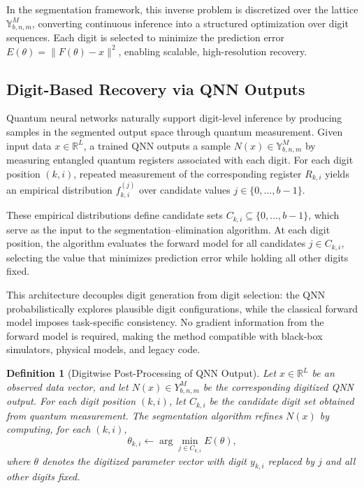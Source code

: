 \documentclass[aps,twocolumn,superscriptaddress,nofootinbib]{revtex4}
\newtheorem{definition}{Definition}
\begin{document}
In the segmentation framework, this inverse problem is discretized over the lattice $\mathbb{Y}_{b,n,m}^M$, converting continuous inference into a structured optimization over digit sequences. Each digit is selected to minimize the prediction error $E(\theta) = \|F(\theta) - x\|^2$, enabling scalable, high-resolution recovery.

\subsection{Digit-Based Recovery via QNN Outputs}
Quantum neural networks naturally support digit-level inference by producing samples in the segmented output space through quantum measurement. Given input data $x \in \mathbb{R}^L$, a trained QNN outputs a sample $N(x) \in \mathbb{Y}_{b,n,m}^M$ by measuring entangled quantum registers associated with each digit. For each digit position $(k, i)$, repeated measurement of the corresponding register $R_{k,i}$ yields an empirical distribution $f^{(j)}_{k,i}$ over candidate values $j \in \{0, \ldots, b - 1\}$.

These empirical distributions define candidate sets $C_{k,i} \subseteq \{0, \ldots, b - 1\}$, which serve as the input to the segmentation--elimination algorithm. At each digit position, the algorithm evaluates the forward model for all candidates $j \in C_{k,i}$, selecting the value that minimizes prediction error while holding all other digits fixed.

This architecture decouples digit generation from digit selection: the QNN probabilistically explores plausible digit configurations, while the classical forward model imposes task-specific consistency. No gradient information from the forward model is required, making the method compatible with black-box simulators, physical models, and legacy code.

\begin{definition}[Digitwise Post-Processing of QNN Output]
Let $x \in \mathbb{R}^L$ be an observed data vector, and let $N(x) \in Y^M_{b,n,m}$ be the corresponding digitized QNN output. For each digit position $(k,i)$, let $C_{k,i}$ be the candidate digit set obtained from quantum measurement. The segmentation algorithm refines $N(x)$ by computing, for each $(k,i)$,
\begin{equation}
    \theta_{k,i} \leftarrow \arg\min_{j \in C_{k,i}} E(\theta), \label{eq:qnn-refinement}
\end{equation}
where $\theta$ denotes the digitized parameter vector with digit $y_{k,i}$ replaced by $j$ and all other digits fixed.
\end{definition}
\end{document}
